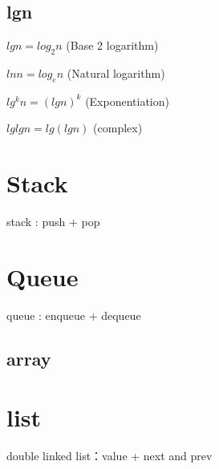 \documentclass[oneside,12pt,twiside,a4paper]{ctexbook}
\begin{document}
\section{lgn}
$lgn = log_2n$ (Base 2 logarithm)

$lnn=log_en$ (Natural logarithm)

$lg^kn=(lgn)^k$ (Exponentiation)

$lglgn = lg(lgn)$ (complex)

%
\chapter{Stack}
stack : push + pop

%
\chapter{Queue}
queue : enqueue + dequeue

%
\section{array}


%
\chapter{list}
double linked list：value + next and prev
\end{document}
